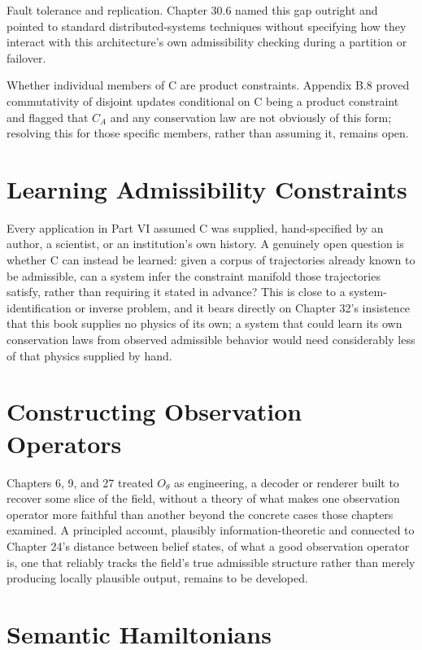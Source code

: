 Fault tolerance and replication. Chapter 30.6 named this gap outright and pointed to standard distributed-systems techniques without specifying how they interact with this architecture's own admissibility checking during a partition or failover.

Whether individual members of C are product constraints. Appendix B.8 proved commutativity of disjoint updates conditional on C being a product constraint and flagged that \(C_A\) and any conservation law are not obviously of this form; resolving this for those specific members, rather than assuming it, remains open.

\section{Learning Admissibility Constraints}

Every application in Part VI assumed C was supplied, hand-specified by an author, a scientist, or an institution's own history. A genuinely open question is whether C can instead be learned: given a corpus of trajectories already known to be admissible, can a system infer the constraint manifold those trajectories satisfy, rather than requiring it stated in advance? This is close to a system-identification or inverse problem, and it bears directly on Chapter 32's insistence that this book supplies no physics of its own; a system that could learn its own conservation laws from observed admissible behavior would need considerably less of that physics supplied by hand.

\section{Constructing Observation Operators}

Chapters 6, 9, and 27 treated \(O_\theta\) as engineering, a decoder or renderer built to recover some slice of the field, without a theory of what makes one observation operator more faithful than another beyond the concrete cases those chapters examined. A principled account, plausibly information-theoretic and connected to Chapter 24's distance between belief states, of what a good observation operator is, one that reliably tracks the field's true admissible structure rather than merely producing locally plausible output, remains to be developed.

\section{Semantic Hamiltonians}

